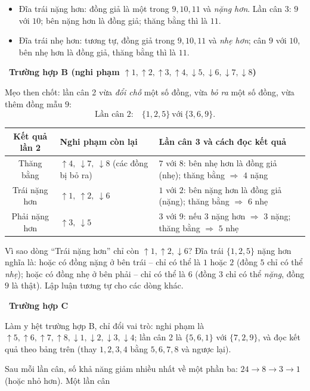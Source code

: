 \documentclass[11pt]{article}
\newcommand{\step}[2]{\par\smallskip\noindent{\bfseries\color{tmBlue!85!black}\StepWord~#1.}\ {\bfseries #2}\par\nopagebreak}
\def\StepWord{Bước}
\begin{document}
{\begin{itemize}[leftmargin=1.4em,itemsep=0pt,topsep=1pt]
  nhẹ (không thể thăng bằng).
  \item Đĩa trái nặng hơn: đồng giả là một trong $9, 10, 11$ và \emph{nặng hơn}. Lần cân 3: $9$ với $10$; bên nặng hơn là đồng giả;
  thăng bằng thì là $11$.
  \item Đĩa trái nhẹ hơn: tương tự, đồng giả trong $9, 10, 11$ và \emph{nhẹ hơn}; cân $9$ với $10$, bên nhẹ hơn là đồng giả,
  thăng bằng thì là $11$.
\end{itemize}
\step{4}{Trường hợp B (nghi phạm $\uparrow 1, \uparrow 2, \uparrow 3, \uparrow 4, \downarrow 5, \downarrow 6, \downarrow 7, \downarrow 8$)}
Mẹo then chốt: lần cân 2 vừa \emph{đổi chỗ} một số đồng, vừa \emph{bỏ ra} một số đồng, vừa thêm đồng mẫu $9$:
\[ \text{Lần cân 2:}\quad \{1, 2, 5\} \ \text{với}\ \{3, 6, 9\}. \]
\begin{center}\footnotesize
\begin{tabular}{|c|p{3.6cm}|p{6.4cm}|}
\hline
\rowcolor{tmBlue!10} Kết quả lần 2 & Nghi phạm còn lại & Lần cân 3 và cách đọc kết quả\\ \hline
Thăng bằng & $\uparrow 4,\ \downarrow 7,\ \downarrow 8$ (các đồng bị bỏ ra) & $7$ với $8$: bên nhẹ hơn là đồng giả (nhẹ);
thăng bằng $\Rightarrow$ $4$ nặng\\ \hline
Trái nặng hơn & $\uparrow 1,\ \uparrow 2,\ \downarrow 6$ & $1$ với $2$: bên nặng hơn là đồng giả (nặng); thăng bằng
$\Rightarrow$ $6$ nhẹ\\ \hline
Phải nặng hơn & $\uparrow 3,\ \downarrow 5$ & $3$ với $9$: nếu $3$ nặng hơn $\Rightarrow$ $3$ nặng; thăng bằng
$\Rightarrow$ $5$ nhẹ\\ \hline
\end{tabular}
\end{center}
\begin{proofbox}Vì sao dòng ``Trái nặng hơn'' chỉ còn $\uparrow 1, \uparrow 2, \downarrow 6$? Đĩa trái $\{1, 2, 5\}$ nặng hơn nghĩa
là: hoặc có đồng nặng ở bên trái -- chỉ có thể là $1$ hoặc $2$ (đồng $5$ chỉ có thể \emph{nhẹ}); hoặc có đồng nhẹ ở bên phải --
chỉ có thể là $6$ (đồng $3$ chỉ có thể \emph{nặng}, đồng $9$ là thật). Lập luận tương tự cho các dòng khác.\end{proofbox}
\step{5}{Trường hợp C}
Làm y hệt trường hợp B, chỉ đổi vai trò: nghi phạm là $\uparrow 5, \uparrow 6, \uparrow 7, \uparrow 8, \downarrow 1, \downarrow 2,
\downarrow 3, \downarrow 4$; lần cân 2 là $\{5, 6, 1\}$ với $\{7, 2, 9\}$, và đọc kết quả theo bảng trên (thay $1, 2, 3, 4$ bằng
$5, 6, 7, 8$ và ngược lại).
\begin{tipbox}Sau mỗi lần cân, số khả năng giảm nhiều nhất về một phần ba: $24 \to 8 \to 3 \to 1$ (hoặc nhỏ hơn). Một lần cân

\end{tipbox}}
\end{document}
